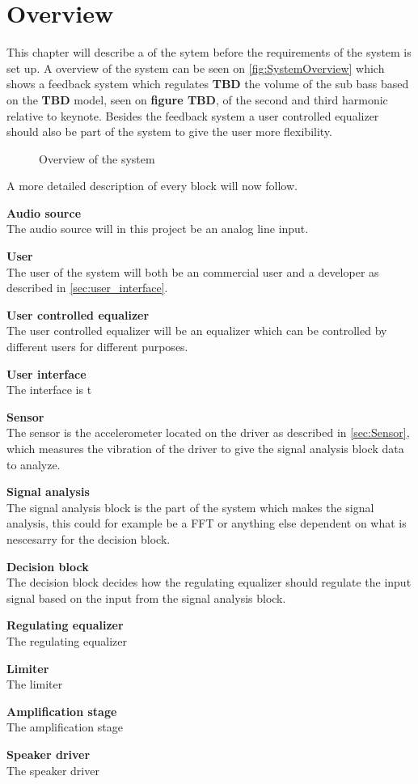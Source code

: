 \chapter{Overview} \label{ch:overview}
This chapter will describe a of the sytem before the requirements of the system is set up. A overview of the system can be seen on \autoref{fig:SystemOverview} which shows a feedback system which regulates \textbf{TBD} the volume of the sub bass based on the \textbf{TBD} model, seen on \textbf{figure TBD}, of the second and third harmonic relative to keynote. Besides the feedback system a user controlled equalizer should also be part of the system to give the user more flexibility.            

\begin{figure}[H]
\centering
{}
\scalebox{0.8}{
}
\caption{Overview of the system}
\label{fig:SystemOverview}
\end{figure}

A more detailed description of every block will now follow.

\textbf{Audio source} \\
The audio source will in this project be an analog line input. 

\textbf{User} \\
The user of the system will both be an commercial user and a developer as described in \autoref{sec:user_interface}. 

\textbf{User controlled equalizer}\\
The user controlled equalizer will be an equalizer which can be controlled by different users for different purposes.

\textbf{User interface} \\
The interface is t 

\textbf{Sensor} \\
The sensor is the accelerometer located on the driver as described in \autoref{sec:Sensor}, which measures the vibration of the driver to give the signal analysis block data to analyze. 

\textbf{Signal analysis} \\
The signal analysis block is the part of the system which makes the signal analysis, this could for example be a FFT or anything else dependent on what is nescesarry for the decision block.

\textbf{Decision block} \\
The decision block decides how the regulating equalizer should regulate the input signal based on the input from the signal analysis block. 

\textbf{Regulating equalizer} \\
The regulating equalizer 

\textbf{Limiter} \\
The limiter

\textbf{Amplification stage} \\
The amplification stage

\textbf{Speaker driver} \\
The speaker driver


